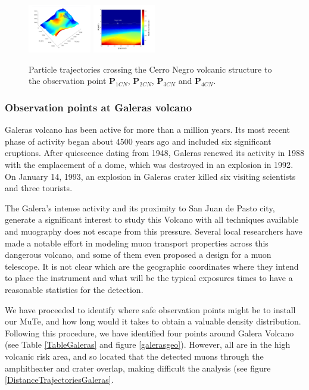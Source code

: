 \documentclass[letterpaper,10pt,titlepage,linenumber]{article}
\begin{document}
\begin{figure}[!ht]
\includegraphics[width=0.245\textwidth]{Figures/Paths4CN}
\includegraphics[width=0.245\textwidth]{Figures/Distance4CN}
	\caption{Particle trajectories crossing the Cerro Negro volcanic structure to the observation point {\bf P$_{1CN}$}, {\bf P$_{2CN}$}, {\bf P$_{3CN}$} and {\bf P$_{4CN}$}.}
  \label{DistanceTrajectoriesCerroNegro}
\end{figure}

\subsubsection{Observation points at Galeras volcano}
Galeras volcano has been active for more than a million years. Its most recent phase of activity began about 4500 years ago and included six significant eruptions. After quiescence dating from 1948, Galeras renewed its activity in 1988 with the emplacement of a dome, which was destroyed in an explosion in 1992\cite{OrdonezCepeda1997}.
On January 14, 1993, an explosion in Galeras crater killed six visiting scientists and three tourists\cite{SeidlEtal2003}. 

The Galera's intense activity and its proximity to San Juan de Pasto city, generate a significant interest to study this Volcano with all techniques available and muography does not escape from this pressure. Several local researchers have made a notable effort in modeling muon transport properties across this dangerous volcano\cite{TapiaEtal2016,GuerreroEtal2019,TorresEtal2019}, and some of them even proposed a design for a muon telescope\cite{GuerreroEtal2019}. It is not clear which are the geographic coordinates where they intend to place the instrument and what will be the typical exposures times to have a reasonable statistics for the detection.

We have proceeded to identify where safe observation points might be to install our MuTe, and how long would it takes to obtain a valuable density distribution. Following this procedure, we have identified four points around Galera Volcano  (see Table \ref{TableGaleras} and figure \ref{galerasgeo}). However, all are in the high volcanic risk area, and so located that the detected muons through the amphitheater and crater overlap, making difficult the analysis (see figure \ref{DistanceTrajectoriesGaleras}.
\end{document}
